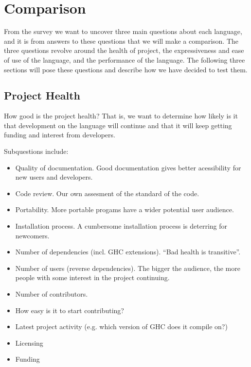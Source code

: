 \section{Comparison}
From the survey we want to uncover three main questions about each
language, and it is from answers to these questions that we will make
a comparison. The three questions revolve around the health of
project, the expressiveness and ease of use of the language, and the
performance of the language. The following three sections will pose
these questions and describe how we have decided to test them.


\subsection{Project Health}
How good is the project health? That is,
we want to determine how likely is it that development on the language
will continue and that it will keep getting funding and interest from
developers.

Subquestions include:
\begin{itemize}
\item Quality of documentation. Good documentation gives better acessibility for new users and developers.
\item Code review. Our own assesment of the standard of the code.
\item Portability. More portable progams have a wider potential user audience.
\item Installation process. A cumbersome installation process is deterring for newcomers.
\item Number of dependencies (incl. GHC extensions). ``Bad health is transitive''.
\item Number of users (reverse dependencies). The bigger the audience, the more people with some interest in the project continuing.
\item Number of contributors.
\item How easy is it to start contributing?
\item Latest project activity (e.g. which version of GHC does it compile on?)
\item Licensing
\item Funding
\end{itemize}



